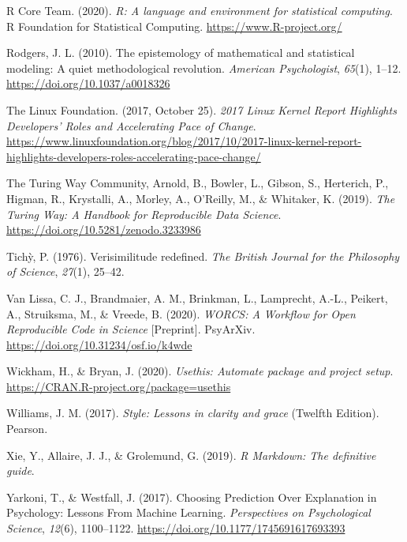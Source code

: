 \documentclass[12pt,a4paper,twoside]{article}
\begin{document}
\leavevmode\hypertarget{ref-R-base}{}%
R Core Team. (2020). \emph{R: A language and environment for statistical computing}. R Foundation for Statistical Computing. \url{https://www.R-project.org/}

\leavevmode\hypertarget{ref-rodgersEpistemologyMathematicalStatistical2010}{}%
Rodgers, J. L. (2010). The epistemology of mathematical and statistical modeling: A quiet methodological revolution. \emph{American Psychologist}, \emph{65}(1), 1--12. \url{https://doi.org/10.1037/a0018326}

\leavevmode\hypertarget{ref-thelinuxfoundation2017LinuxKernel2017}{}%
The Linux Foundation. (2017, October 25). \emph{2017 Linux Kernel Report Highlights Developers' Roles and Accelerating Pace of Change}. \url{https://www.linuxfoundation.org/blog/2017/10/2017-linux-kernel-report-highlights-developers-roles-accelerating-pace-change/}

\leavevmode\hypertarget{ref-theturingwaycommunityTuringWayHandbook2019}{}%
The Turing Way Community, Arnold, B., Bowler, L., Gibson, S., Herterich, P., Higman, R., Krystalli, A., Morley, A., O'Reilly, M., \& Whitaker, K. (2019). \emph{The Turing Way: A Handbook for Reproducible Data Science}. \url{https://doi.org/10.5281/zenodo.3233986}

\leavevmode\hypertarget{ref-tichyVerisimilitudeRedefined1976}{}%
Tichỳ, P. (1976). Verisimilitude redefined. \emph{The British Journal for the Philosophy of Science}, \emph{27}(1), 25--42.

\leavevmode\hypertarget{ref-vanlissaWORCSWorkflowOpen2020}{}%
Van Lissa, C. J., Brandmaier, A. M., Brinkman, L., Lamprecht, A.-L., Peikert, A., Struiksma, M., \& Vreede, B. (2020). \emph{WORCS: A Workflow for Open Reproducible Code in Science} {[}Preprint{]}. PsyArXiv. \url{https://doi.org/10.31234/osf.io/k4wde}

\leavevmode\hypertarget{ref-R-usethis}{}%
Wickham, H., \& Bryan, J. (2020). \emph{Usethis: Automate package and project setup}. \url{https://CRAN.R-project.org/package=usethis}

\leavevmode\hypertarget{ref-williamsStyleLessonsClarity2017}{}%
Williams, J. M. (2017). \emph{Style: Lessons in clarity and grace} (Twelfth Edition). Pearson.

\leavevmode\hypertarget{ref-xieMarkdownDefinitiveGuide2019}{}%
Xie, Y., Allaire, J. J., \& Grolemund, G. (2019). \emph{R Markdown: The definitive guide}.

\leavevmode\hypertarget{ref-yarkoniChoosingPredictionExplanation2017}{}%
Yarkoni, T., \& Westfall, J. (2017). Choosing Prediction Over Explanation in Psychology: Lessons From Machine Learning. \emph{Perspectives on Psychological Science}, \emph{12}(6), 1100--1122. \url{https://doi.org/10.1177/1745691617693393}
\end{document}
